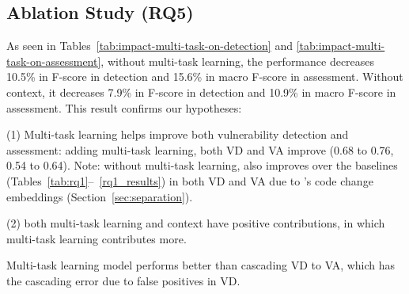 \subsection{\bf Ablation Study (RQ5)}




As seen in Tables~\ref{tab:impact-multi-task-on-detection}
and \ref{tab:impact-multi-task-on-assessment}, without multi-task
learning, the performance decreases 10.5\% in F-score in detection and 15.6\% in
macro F-score in assessment. Without context, it decreases 7.9\%
in F-score in detection and 10.9\% in macro F-score in assessment.
This result confirms our hypotheses:

(1) Multi-task learning helps improve both vulnerability detection and
assessment: adding multi-task learning, both VD and VA improve (0.68
to 0.76, 0.54 to 0.64). Note: without multi-task learning, {\tool}
also improves over the baselines
(Tables~\ref{tab:rq1}--~\ref{rq1_results}) in both VD and VA due to
{\tool}'s code change embeddings
(Section~\ref{sec:separation}).


(2) both multi-task learning and context have positive contributions,
in which multi-task learning contributes more.

Multi-task learning model performs better than cascading VD to
VA, which has the cascading error due to false positives in VD.




